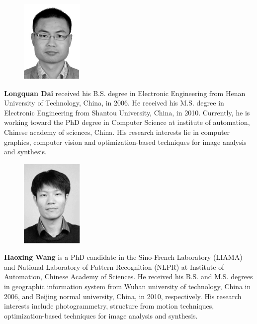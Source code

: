 \documentclass[preprint,10pt,5p,times,twocolumn]{elsarticle}
\begin{document}






\begin{figure}
\includegraphics [width=3cm,clip]{dai.pdf}
\end{figure}
\textbf{Longquan Dai} received his B.S. degree in Electronic Engineering from Henan University of Technology, China, in 2006. He received his M.S. degree in Electronic Engineering from Shantou University, China, in 2010. Currently, he is working toward the PhD degree in Computer Science  at institute of automation, Chinese academy of sciences, China. His research interests lie in computer graphics, computer vision and optimization-based techniques for image analysis and synthesis.



\begin{figure}
\includegraphics [width=3cm,clip]{wang.pdf}
\end{figure}
\textbf{Haoxing Wang} is a PhD candidate in the Sino-French Laboratory (LIAMA) and National Laboratory of Pattern
Recognition (NLPR) at Institute of Automation, Chinese Academy of Sciences. He received his B.S. and M.S. degrees in geographic information system from Wuhan university of technology, China in 2006, and Beijing normal university, China, in 2010, respectively. His research interests include photogrammetry, structure from motion techniques, optimization-based techniques for image analysis and synthesis.
\end{document}
